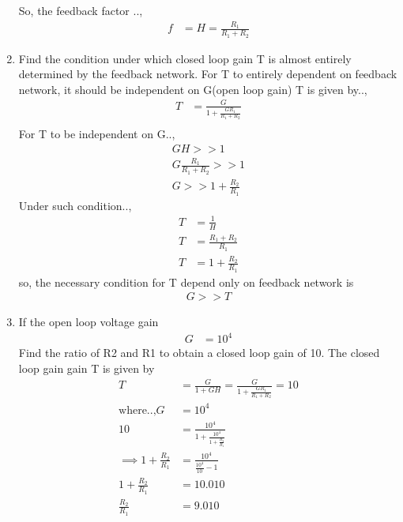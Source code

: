 \begin{enumerate}[label=\thesubsection.\arabic*.,ref=\thesubsection.\theenumi]
\begin{figure}[!ht]
	\begin{center}
			\resizebox{\columnwidth}{!}{}
	\end{center}
\caption{}
\label{fig:equivalent_control_system}
\end{figure}
So, the feedback factor ..,
\begin{align}
     f &= H = \frac{R_1}{R_1+R_2}
\end{align}
\item Find the condition under which closed loop gain T is almost entirely determined by the feedback network.
\solution For T to entirely dependent on feedback network, it should be independent on G(open loop gain)
T is given by..,
\begin{align}
    T &= \frac{G}{1+\frac{GR_1}{R_1+R_2}} \\
\end{align}
For T to be independent on G..,
\begin{align}
 GH >> 1 \\
 G\frac{R_1}{R_1+R_2} >> 1 \\
 G >> 1 + \frac{R_2}{R_1} 
\end{align}
Under such condition..,
\begin{align}
    T &= \frac{1}{H} \\
    T &= \frac{R_1+R_2}{R_1}\\
    T &= 1+\frac{R_2}{R_1}
\end{align}
so, the necessary condition for T depend only on feedback network is
\begin{align}
    G >> T
\end{align}
\item If the open loop voltage gain
\begin{align} 
G & = 10^4
\end{align}
Find the ratio of R2 and R1 to obtain a closed loop gain of 10.
\solution The closed loop gain gain T is given by
\begin{align}
    T &= \frac{G}{1+GH}
        = \frac{G}{1+\frac{GR_1}{R_1+R_2}} = 10\\
    \text{where..,} G &= 10^4 \\
    10 &= \frac{10^4}{1+\frac{10^4}{1+\frac{R_2}{R_1}}}\\
\implies 1+\frac{R_2}{R_1} &= \frac{10^4}{\frac{10^4}{10}-1}
\\
1+\frac{R_2}{R_1} &= 10.010
\\
\frac{R_2}{R_1} &= 9.010

\end{align}
\end{enumerate}
